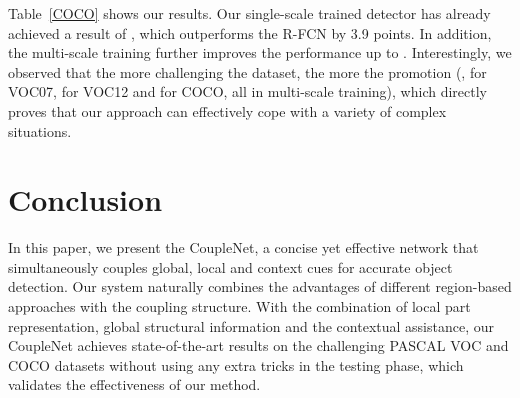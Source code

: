 \documentclass[10pt,twocolumn,letterpaper]{article}
\begin{document}
Table~\ref{COCO} shows our results. Our single-scale trained detector has already achieved a result of , which outperforms the R-FCN by 3.9 points. In addition, the multi-scale training further improves the performance up to . Interestingly, we observed that the more challenging the dataset, the more the promotion (\eg,  for VOC07,  for VOC12 and  for COCO, all in multi-scale training), which directly proves that our approach can effectively cope with a variety of complex situations.

\section{Conclusion}
In this paper, we present the CoupleNet, a concise yet effective network that simultaneously couples global, local and context cues for accurate object detection.
Our system naturally combines the advantages of different region-based approaches with the coupling structure. With the combination of local part representation, global structural information and the contextual assistance, our CoupleNet achieves state-of-the-art results on the challenging PASCAL VOC and COCO datasets without using any extra tricks in the testing phase, which validates the effectiveness of our method.

{\small


}
\end{document}

